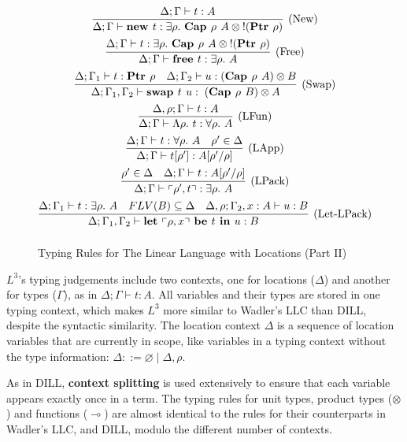 \documentclass[]{unswthesis}
\let\emptyset\varnothing
\newcommand{\Forall}[1]{\forall #1 \ldotp \,}
\newcommand{\Exists}[1]{\exists #1 \ldotp \,}
\newcommand{\Lam}[1]{\Lambda #1 \ldotp \,}
\newcommand{\lolly}{\multimap}
\newcommand{\types}{\vdash}
\newcommand{\letbe}[3]{\textbf{let $#1$ be $#2$ in $#3$}}
\newcommand{\sor}{\; | \;}
\newcommand{\Ptr}[1]{\textbf{Ptr $#1$}}
\newcommand{\Capa}[2]{\textbf{Cap $#1$ $#2$}}
\newcommand{\lquine}{\left\ulcorner}
\newcommand{\rquine}{\right\urcorner}
\newcommand{\lnew}[1]{\textbf{new $#1$}}
\newcommand{\lfree}[1]{\textbf{free $#1$}}
\newcommand{\lswap}[2]{\textbf{swap $#1$ $#2$}}
\newcommand{\qpair}[2]{\lquine #1, #2 \rquine}
\let\b\textbf
\let\t\text
\begin{document}
\begin{figure}[H]
\caption{Typing Rules for The Linear Language with Locations (Part II)}
\label{l3_typing_part2}
\begin{displaymath}
\arraycolsep=0.5pt\def\arraystretch{2.2}
\begin{array}{c}
\infer[\t{(New)}]{\Delta; \Gamma \types \lnew{t} : \Exists{\rho} \Capa{\rho}{A} \otimes {!(\Ptr{\rho})}}{
  \Delta; \Gamma \types t : A
} \\
\infer[\t{(Free)}]{\Delta; \Gamma \types \lfree{t} : \Exists{\rho} A}{
  \Delta; \Gamma \types t : \Exists{\rho} \Capa{\rho}{A} \otimes {!(\Ptr{\rho})}
} \\
\infer[\t{(Swap)}]{\Delta; \Gamma_1, \Gamma_2 \types \lswap{t}{u} : \; (\Capa{\rho}{B}) \otimes A}{
  \Delta; \Gamma_1 \types t : \Ptr{\rho}  &  \Delta; \Gamma_2 \types u : (\Capa{\rho}{A}) \otimes B
} \\
\infer[\t{(LFun)}]{\Delta; \Gamma \types \Lam{\rho} t : \Forall{\rho} A}{
  \Delta, \rho; \Gamma \types t : A
} \\
\infer[\t{(LApp)}]{\Delta; \Gamma \types t [\rho'] : A[\rho' / \rho]}{
  \Delta; \Gamma \types t : \Forall{\rho} A  &  \rho' \in \Delta
} \\
\infer[\t{(LPack)}]{\Delta; \Gamma \types \qpair{\rho'}{t} : \Exists{\rho} A} {
  \rho' \in \Delta  &  \Delta; \Gamma \types t : A[\rho' / \rho]
} \\
\infer[\t{(Let-LPack)}]{\Delta; \Gamma_1, \Gamma_2 \types \letbe{\qpair{\rho}{x}}{t}{u} : B}{
  \Delta; \Gamma_1 \types t : \Exists{\rho} A  &  FLV(B) \subseteq \Delta  &
  \Delta, \rho; \Gamma_2, x : A \types u : B
}
\end{array}
\end{displaymath}
\end{figure}

$L^3$'s typing judgements include two contexts, one for locations ($\Delta$) and another for types ($\Gamma$), as in $\Delta; \Gamma \types t : A$. All variables and their types are stored in one typing context, which makes $L^3$ more similar to Wadler's LLC than DILL, despite the syntactic similarity. The location context $\Delta$ is a sequence of location variables that are currently in scope, like variables in a typing context without the type information: $\Delta ::= \emptyset \sor \Delta, \rho$.

As in DILL, \b{context splitting} is used extensively to ensure that each variable appears exactly once in a term. The typing rules for unit types, product types ($\otimes$) and functions ($\lolly$) are almost identical to the rules for their counterparts in Wadler's LLC, and DILL, modulo the different number of contexts.
\end{document}
